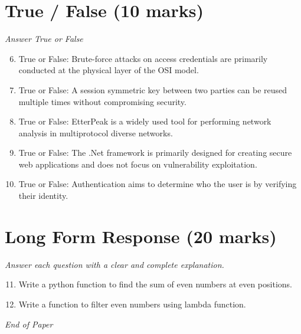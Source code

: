 \documentclass[12pt]{article}
\begin{document}
\section*{True / False (10 marks)}
\textit{Answer True or False}
\begin{enumerate}[label=\arabic*.]
\setcounter{enumi}{5}
\item True or False: Brute-force attacks on access credentials are primarily conducted at the physical layer of the OSI model.
\item True or False: A session symmetric key between two parties can be reused multiple times without compromising security.
\item True or False: EtterPeak is a widely used tool for performing network analysis in multiprotocol diverse networks.
\item True or False: The .Net framework is primarily designed for creating secure web applications and does not focus on vulnerability exploitation.
\item True or False: Authentication aims to determine who the user is by verifying their identity.
\end{enumerate}

\section*{Long Form Response (20 marks)}
\textit{Answer each question with a clear and complete explanation.}
\begin{enumerate}[label=\arabic*.]
\setcounter{enumi}{10}
\item Write a python function to find the sum of even numbers at even positions.
\item Write a function to filter even numbers using lambda function.
\end{enumerate}

\vfill
\noindent\textit{End of Paper}
\end{document}
